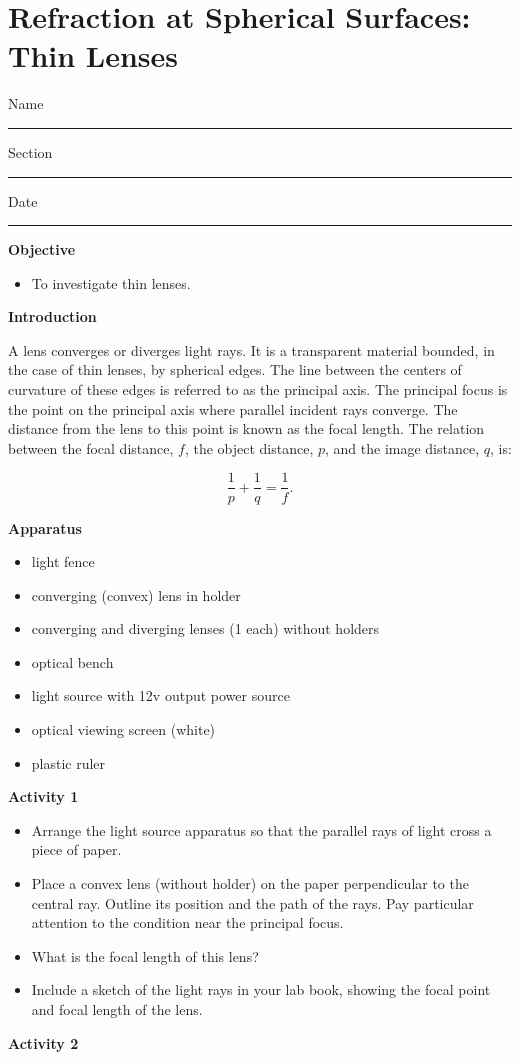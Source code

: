 
\section{Refraction at Spherical Surfaces: Thin Lenses}

Name \rule{2.0in}{0.1pt}\hfill{}Section \rule{1.0in}{0.1pt}\hfill{}Date
\rule{1.0in}{0.1pt}

\textbf{Objective}

\begin{itemize}
\item To investigate thin lenses.
\end{itemize}
\textbf{Introduction} 

A lens converges or diverges light rays. It is a transparent material
bounded, in the case of thin lenses, by spherical edges. The line
between the centers of curvature of these edges is referred to as
the principal axis. The principal focus is the point on the principal
axis where parallel incident rays converge. The distance from the
lens to this point is known as the focal length. The relation between
the focal distance, $f$, the object distance, $p$, and the image distance,
$q$, is:

\begin{displaymath} \frac{1}{p} + \frac{1}{q} = \frac{1}{f}. \end{displaymath}

\textbf{Apparatus}

\begin{itemize}
\item light fence
\item converging (convex) lens in holder
\item converging and diverging lenses (1 each) without holders
\item optical bench 
\item light source with 12v output power source
\item optical viewing screen (white)
\item plastic ruler
\end{itemize}

\textbf{Activity 1}

\begin{itemize}
\item Arrange the light source apparatus so that the parallel rays of light
cross a piece of paper. 
\item Place a convex lens (without holder) on the paper perpendicular to the 
central ray.
Outline its position and the path of the rays. Pay particular attention
to the condition near the principal focus.
\item What is the focal length of this lens?\vspace{15mm}
\item Include a sketch of the light rays in your lab book, showing the focal point and focal length of the lens.
\end{itemize}
\textbf{Activity 2 }

